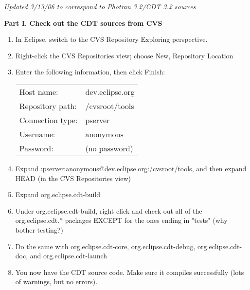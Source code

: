 
\textit{Updated 3/13/06 to correspond to Photran 3.2/CDT 3.2 sources}

\hspace{1em}\textbf{Part I.  Check out the CDT sources from CVS}

\begin{enumerate}
\item  In Eclipse, switch to the CVS Repository Exploring perspective.
\item  Right-click the CVS Repositories view; choose New, Repository Location
\item  Enter the following information, then click Finish: \\
\begin{tabular}{ll}
         Host name:       & dev.eclipse.org \\
         Repository path: & /cvsroot/tools \\
         Connection type: & pserver \\
         Username:        & anonymous \\
         Password:        & (no password) \\
\end{tabular}
\item  Expand :pserver:anonymous@dev.eclipse.org:/cvsroot/tools,
    and then expand HEAD (in the CVS Repositories view)
\item  Expand org.eclipse.cdt-build
\item  Under org.eclipse.cdt-build, right click and check out all of the org.eclipse.cdt.* packages
    EXCEPT for the ones ending in "tests" (why bother testing?)
\item  Do the same with org.eclipse.cdt-core, org.eclipse.cdt-debug,
    org.eclipse.cdt-doc, and org.eclipse.cdt-launch
\item You now have the CDT source code.  Make sure it compiles successfully
    (lots of warnings, but no errors).


\end{enumerate}
